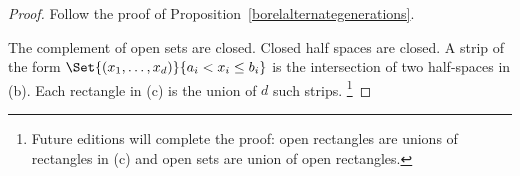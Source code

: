 \begin{proof}Follow the proof of Proposition~\ref{borelalternategenerations}.

The complement of open sets are closed.
Closed half spaces are closed.
A strip of the form $\Set{(x_1, \dots , x_d)}{a_i < x_i \leq b_i}$ is the intersection of two half-spaces in (b).
Each rectangle in (c) is the union of $d$ such strips.
\ifhmode\unskip\fi\footnote{
Future editions will complete the proof:
open rectangles are unions of
rectangles in (c) and
open sets are union of open rectangles.
}
\end{proof}